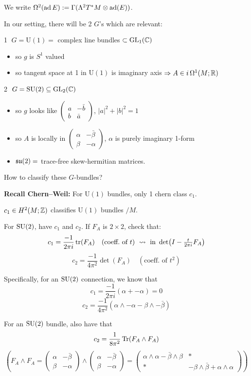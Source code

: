 \documentclass[main]{subfiles}
\begin{document}
We write $\Omega^2(\operatorname{ad} E) := \Gamma(\Lambda^2 T^\ast M \otimes \operatorname{ad}(E))$.

In our setting, there will be 2 $G$'s which are relevant:

\medskip\noindent\textcircled{1} $G = \mathrm{U}(1) = $ complex line bundles $\subset \operatorname{GL}_1(\mathbb C)$
\begin{itemize}
	\item[] so $g$ is $S^1$ valued
	\item[] so tangent space at 1 in $\mathrm{U}(1)$ is imaginary axis $\Rightarrow A \in i\,\Omega^1(M;\mathbb R)$
\end{itemize}

\medskip\noindent\textcircled{2} $G = \operatorname{SU}(2) \subseteq \operatorname{GL}_2(\mathbb C)$
\begin{itemize}
	\item[] so $g$ looks like $\begin{pmatrix} a & -\bar b \\ b & \bar a\end{pmatrix}$, $|a|^2+|b|^2=1$
	\item[] so $A$ is locally in $\begin{pmatrix}\alpha & -\bar\beta \\ \beta & -\alpha\end{pmatrix}$, $\alpha$ is purely imaginary 1-form
	\item[] $\mathfrak{su}(2) = $ trace-free skew-hermitian matrices.
\end{itemize}

How to classify these $G$-bundles?

\textbf{Recall Chern--Weil:} For $\mathrm{U}(1)$ bundles, only 1 chern class $c_1$.

\begin{theorem}
$c_1 \in H^2(M;\mathbb Z)$ classifies $\mathrm{U}(1)$ bundles $/M$.
\end{theorem}

For $\operatorname{SU}(2)$, have $c_1$ and $c_2$. If $F_A$ is $2\times 2$, check that:
\[
c_1 = \frac{-1}{2\pi i}\operatorname{tr}(F_A) \quad (\text{coeff.\ of } t) \ \rightsquigarrow \text{ in } \det\!\left(I - \tfrac{t}{2\pi i}F_A\right)
\]
\[
c_2 = \frac{-1}{4\pi^2}\det(F_A) \quad (\text{coeff.\ of } t^2)
\]

Specifically, for an $\operatorname{SU}(2)$ connection, we know that
\[
c_1 = \frac{-1}{2\pi i}(\alpha + -\alpha) = 0
\]
\[
c_2 = \frac{-1}{4\pi^2}\left(\alpha\wedge -\alpha - \beta \wedge -\bar\beta\right)
\]

For an $\operatorname{SU}(2)$ bundle, also have that
\[
c_2 = \frac{1}{8\pi^2}\operatorname{Tr}(F_A \wedge F_A)
\]
\[
\left(F_A \wedge F_A = \begin{pmatrix}\alpha & -\bar\beta\\ \beta & -\alpha\end{pmatrix}\wedge\begin{pmatrix}\alpha & -\bar\beta\\ \beta & -\alpha\end{pmatrix} = \begin{pmatrix}\alpha\wedge\alpha - \bar\beta\wedge\beta & \ast \\ \ast & -\beta\wedge\bar\beta+\alpha\wedge\alpha\end{pmatrix}\right)
\]
\end{document}

